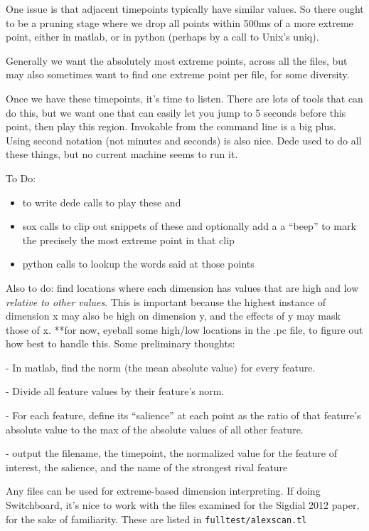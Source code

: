\documentclass[11pt]{article}
\begin{document}
One issue is that adjacent timepoints typically have similar values.
So there ought to be a pruning stage where we drop all points within
500ms of a more extreme point, either in matlab, or in python (perhaps
by a call to Unix's uniq).

Generally we want the absolutely most extreme points, across all the
files, but may also sometimes want to find one extreme point per file,
for some diversity.

Once we have these timepoints, it's time to listen.  There are lots of
tools that can do this, but we want one that can easily let you jump
to 5 seconds before this point, then play this region.  Invokable from
the command line is a big plus.  Using second notation (not minutes
and seconds) is also nice.  Dede used to do all these things, but no
current machine seems to run it.

To Do:
\begin{itemize}   \setlength{\itemsep}{0pt}\setlength{\parskip}{0pt}
\item to write dede calls to play these and 
\item sox calls to clip out snippets of these and optionally add a 
  a ``beep'' to mark the precisely  the most extreme point in that clip
\item python calls to lookup the words said at those points
\end{itemize}

Also to do: find locations where each dimension has values that are
high and low {\em relative to other values}.  This is important
because the highest instance of dimension x may also be high on
dimension y, and the effects of y may mask those of x.  **for now,
eyeball some high/low locations in the .pc file, to figure out how
best to handle this.  Some preliminary thoughts:

- In matlab, find the norm (the mean absolute value) for every feature.

- Divide all feature values by their feature's norm.  

- For each feature, define its ``salience'' at each point as the ratio
of that feature's absolute value to the max of the absolute values of
all other feature.

- output the filename, the timepoint, the normalized value for the
feature of interest, the salience, and the name of the strongest rival
feature

\bigskip
Any files can be used for extreme-based dimension interpreting.  If
doing Switchboard, it's nice to work with the files examined for the
Sigdial 2012 paper, for the sake of familiarity.  These are listed in
{\tt fulltest/alexscan.tl}
\end{document}
